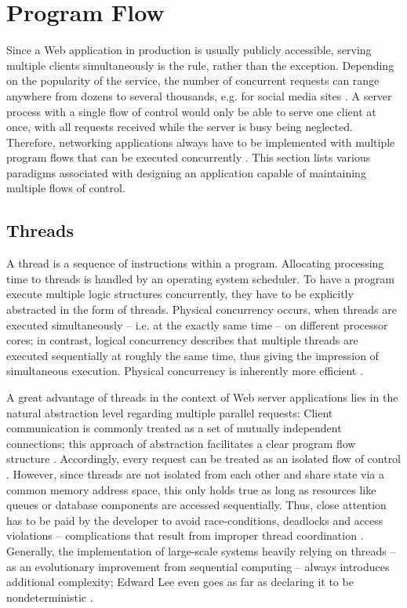 \section{Program Flow}

Since a Web application in production is usually publicly accessible, serving multiple clients simultaneously is the rule, rather than the exception. Depending on the popularity of the service, the number of concurrent requests can range anywhere from dozens to several thousands, e.g. for social media sites \cite[p. 1]{Drolia2010}. A server process with a single flow of control would only be able to serve one client at once, with all requests received while the server is busy being neglected. Therefore, networking applications always have to be implemented with multiple program flows that can be executed concurrently \cite{Webopedia}. This section lists various paradigms associated with designing an application capable of maintaining multiple flows of control.

\subsection{Threads}
\label{sec:threads}
A thread is a sequence of instructions within a program. Allocating processing time to threads is handled by an operating system scheduler. To have a program execute multiple logic structures concurrently, they have to be explicitly abstracted in the form of threads. Physical concurrency occurs, when threads are executed simultaneously -- i.e. at the exactly same time -- on different processor cores; in contrast, logical concurrency describes that multiple threads are executed sequentially at roughly the same time, thus giving the impression of simultaneous execution. Physical concurrency is inherently more efficient \cite{ThreadsJava}.

A great advantage of threads in the context of Web server applications lies in the natural abstraction level regarding multiple parallel requests: Client communication is commonly treated as a set of mutually independent connections; this approach of abstraction facilitates a clear program flow structure \cite{Veal2007}. Accordingly, every request can be treated as an isolated flow of control \cite[p. 2]{Behren2003}. However, since threads are not isolated from each other and share state via a common memory address space, this only holds true as long as resources like queues or database components are accessed sequentially. Thus, close attention has to be paid by the developer to avoid race-conditions, deadlocks and access violations -- complications that result from improper thread coordination \cite[p. 1]{Fischer2007}. Generally, the implementation of large-scale systems heavily relying on threads -- as an evolutionary improvement from sequential computing -- always introduces additional complexity; Edward Lee even goes as far as declaring it to be nondeterministic \cite[p. 1]{Lee2006}.

